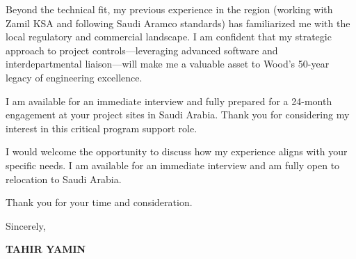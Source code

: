 \documentclass[11pt,a4paper]{article}
\begin{document}
Beyond the technical fit, my previous experience in the region (working with Zamil KSA and following Saudi Aramco standards) has familiarized me with the local regulatory and commercial landscape. I am confident that my strategic approach to project controls—leveraging advanced software and interdepartmental liaison—will make me a valuable asset to Wood’s 50-year legacy of engineering excellence.

I am available for an immediate interview and fully prepared for a 24-month engagement at your project sites in Saudi Arabia. Thank you for considering my interest in this critical program support role.

I would welcome the opportunity to discuss how my experience aligns with your specific needs. I am available for an immediate interview and am fully open to relocation to Saudi Arabia.

Thank you for your time and consideration.

\vspace{0.5cm}
Sincerely,

\vspace{0.5cm}
\textbf{TAHIR YAMIN}
\end{document}
